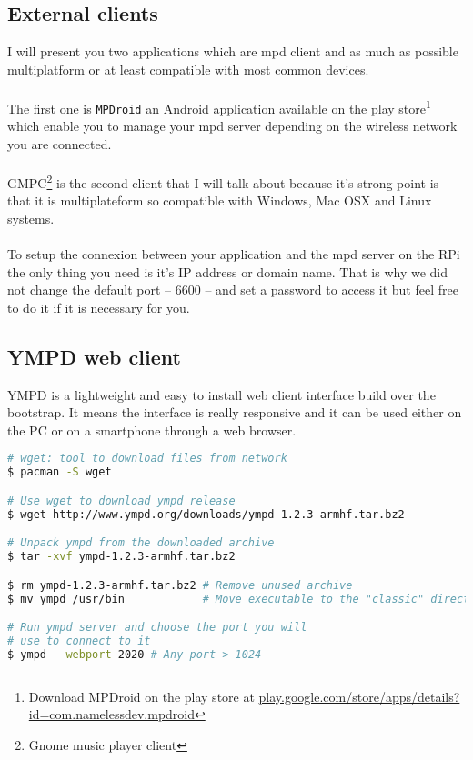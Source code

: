 \subsection{External clients}
I will present you two applications which are mpd client and as much as possible 
multiplatform or at least compatible with most common devices.
\\\\
The first one is \texttt{MPDroid} an Android application available on the play 
store\footnote{Download MPDroid on the play store at \href{http://play.google.com/
store/apps/details?id=com.namelessdev.mpdroid}{play.google.com/store/apps/details?
id=com.namelessdev.mpdroid}} which enable you to manage your mpd server depending 
on the wireless network you are connected.
\\\\
GMPC\footnote{Gnome music player client} is the second client that I will talk 
about because it's strong point is that it is multiplateform so compatible with 
Windows, Mac OSX and Linux systems.
\\\\
To setup the connexion between your application and the mpd server on the RPi the 
only thing you need is it's IP address or domain name. That is why we did not 
change the default port -- 6600 -- and set a password to access it but feel free 
to do it if it is necessary for you.

\subsection{YMPD web client}
YMPD is a lightweight and easy to install web client interface build over the 
bootstrap. It means the interface is really responsive and it can be used 
either on the PC or on a smartphone through a web browser.

\begin{lstlisting}[language=bash,caption=ympd setup]
# wget: tool to download files from network
$ pacman -S wget

# Use wget to download ympd release
$ wget http://www.ympd.org/downloads/ympd-1.2.3-armhf.tar.bz2

# Unpack ympd from the downloaded archive
$ tar -xvf ympd-1.2.3-armhf.tar.bz2

$ rm ympd-1.2.3-armhf.tar.bz2 # Remove unused archive
$ mv ympd /usr/bin            # Move executable to the "classic" directory

# Run ympd server and choose the port you will
# use to connect to it
$ ympd --webport 2020 # Any port > 1024
\end{lstlisting}


